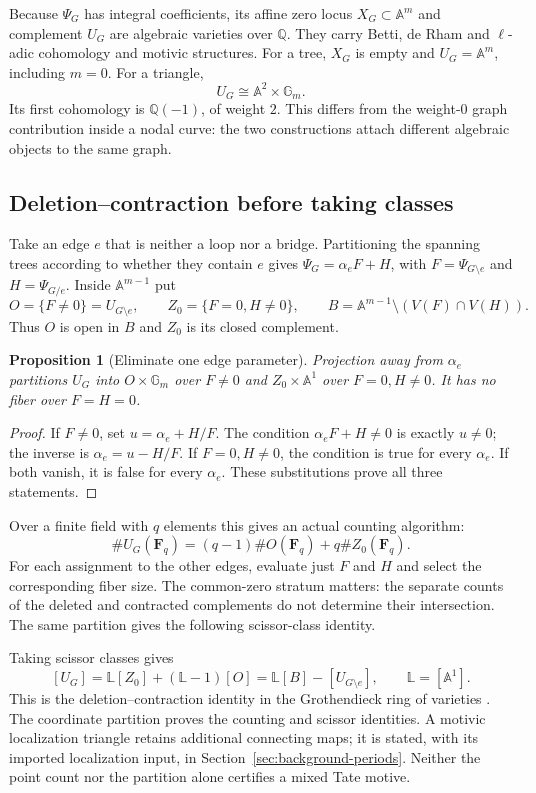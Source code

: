 \documentclass[11pt]{article}
\newtheorem{proposition}[theorem]{Proposition}
\theoremstyle{definition}
\theoremstyle{remark}
\newcommand{\Q}{\mathbb Q}
\newcommand{\A}{\mathbb A}
\newcommand{\Gm}{\mathbb G_m}
\begin{document}
Because $\Psi_G$ has integral coefficients, its affine zero locus
$X_G\subset\mathbb A^m$ and complement $U_G$ are algebraic varieties
over $\Q$.  They carry Betti, de Rham and $\ell$-adic cohomology and
motivic structures.  For a tree, $X_G$ is empty and
$U_G=\mathbb A^m$, including $m=0$.  For a triangle,
\[
  U_G\cong\mathbb A^2\times\mathbb G_m.
\]
Its first cohomology is $\Q(-1)$, of weight $2$.  This differs from the
weight-$0$ graph contribution inside a nodal curve: the two constructions
attach different algebraic objects to the same graph.

\subsection{Deletion--contraction before taking classes}
\label{sec:derived-graph-localization}

Take an edge $e$ that is neither a loop nor a bridge. Partitioning the
spanning trees according to whether they contain $e$ gives
$\Psi_G=\alpha_eF+H$, with $F=\Psi_{G\setminus e}$ and $H=\Psi_{G/e}$.
Inside $\A^{m-1}$ put
\[
 O=\{F\ne0\}=U_{G\setminus e},\qquad
 Z_0=\{F=0,H\ne0\},\qquad
 B=\A^{m-1}\setminus(V(F)\cap V(H)).
\]
Thus $O$ is open in $B$ and $Z_0$ is its closed complement.

\begin{proposition}[Eliminate one edge parameter]
\label{prop:edge-parameter-elimination}
Projection away from $\alpha_e$ partitions $U_G$ into $O\times\Gm$ over $F\ne0$ and $Z_0\times\A^1$ over $F=0,H\ne0$. It has no fiber over $F=H=0$.
\end{proposition}
\begin{proof}
If $F\ne0$, set $u=\alpha_e+H/F$. The condition $\alpha_eF+H\ne0$ is exactly $u\ne0$; the inverse is $\alpha_e=u-H/F$. If $F=0,H\ne0$, the condition is true for every $\alpha_e$. If both vanish, it is false for every $\alpha_e$. These substitutions prove all three statements.
\end{proof}

Over a finite field with $q$ elements this gives an actual counting algorithm:
\[
 \#U_G(\mathbf F_q)=(q-1)\#O(\mathbf F_q)+q\#Z_0(\mathbf F_q).
\]
For each assignment to the other edges, evaluate just $F$ and $H$ and select the corresponding fiber size. The common-zero stratum matters: the separate counts of the deleted and contracted complements do not determine their intersection. The same partition gives the following scissor-class identity.

Taking scissor classes gives
\[
 [U_G]=\mathbb L[Z_0]+(\mathbb L-1)[O]
      =\mathbb L[B]-[U_{G\setminus e}],\qquad\mathbb L=[\A^1].
\]
This is the deletion--contraction identity in the Grothendieck ring of
varieties \cite[Theorem 3.8]{AluffiMarcolliDeletionContraction}. The coordinate
partition proves the counting and scissor identities. A motivic localization
triangle retains additional connecting maps; it is stated, with its imported
localization input, in Section~\ref{sec:background-periods}. Neither the
point count nor the partition alone certifies a mixed Tate motive.
\end{document}
